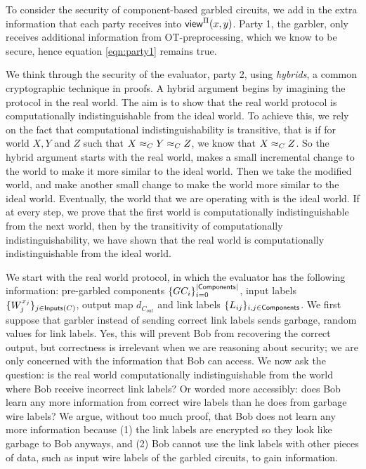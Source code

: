 To consider the security of component-based garbled circuits, we add in the extra information that each party receives into ${\sf view}^{\Pi}(x,y)$. 
Party 1, the garbler, only receives additional information from OT-preprocessing, which we know to be secure, hence equation \ref{eqn:party1} remains true. 

We think through the security of the evaluator, party 2, using \textit{hybrids}, a common cryptographic technique in proofs. 
A hybrid argument begins by imagining the protocol in the real world. 
The aim is to show that the real world protocol is computationally indistinguishable from the ideal world. 
To achieve this, we rely on the fact that computational indistinguishability is transitive, that is if for world $X, Y$ and $Z$ such that $X \approx_C Y \approx_C Z$, we know that $X \approx_C Z$. 
So the hybrid argument starts with the real world, makes a small incremental change to the world to make it more similar to the ideal world.
Then we take the modified world, and make another small change to make the world more similar to the ideal world. 
Eventually, the world that we are operating with is the ideal world. 
If at every step, we prove that the first world is computationally indistinguishable from the next world, then by the transitivity of computationally indistinguishability, we have shown that the real world is computationally indistinguishable from the ideal world. 

We start with the real world protocol, in which the evaluator has the following information: pre-garbled components $\{GC_i\}_{i = 0}^{|\textsf{Components}|}$, input labels $\{W_j^{x_j}\}_{j \in \textsf{Inputs}(C)}$, output map $d_{C_{out}}$ and link labels $\{L_{ij}\}_{i,j \in \textsf{Components}}$.
We first suppose that garbler instead of sending correct link labels sends garbage, random values for link labels. 
Yes, this will prevent Bob from recovering the correct output, but correctness is irrelevant when we are reasoning about security; we are only concerned with the information that Bob can access. 
We now ask the question: is the real world computationally indistinguishable from the world where Bob receive incorrect link labels?
Or worded more accessibly: does Bob learn any more information from correct wire labels than he does from garbage wire labels?
We argue, without too much proof, that Bob does not learn any more information because (1) the link labels are encrypted so they look like garbage to Bob anyways, and (2) Bob cannot use the link labels with other pieces of data, such as input wire labels of the garbled circuits, to gain information. 

